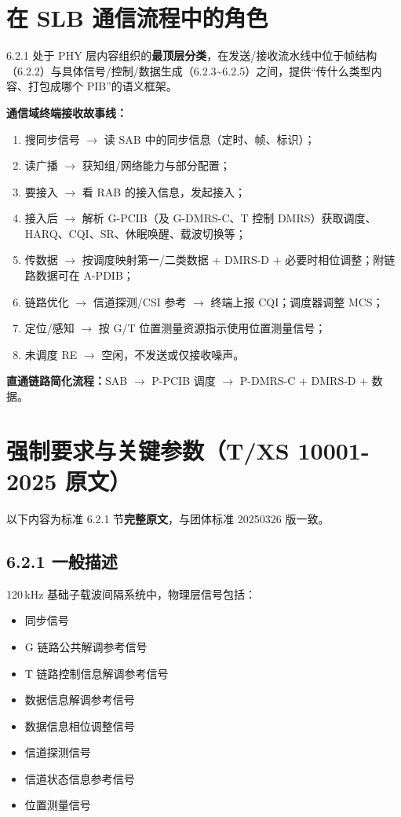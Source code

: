 \documentclass[11pt,a4paper]{ctexart}
\begin{document}
\section{在 SLB 通信流程中的角色}

6.2.1 处于 PHY 层内容组织的\textbf{最顶层分类}，在发送/接收流水线中位于帧结构（6.2.2）与具体信号/控制/数据生成（6.2.3\textasciitilde 6.2.5）之间，提供``传什么类型内容、打包成哪个 PIB''的语义框架。

\textbf{通信域终端接收故事线：}
\begin{enumerate}[nosep]
  \item 搜同步信号 $\rightarrow$ 读 SAB 中的同步信息（定时、帧、标识）；
  \item 读广播 $\rightarrow$ 获知组/网络能力与部分配置；
  \item 要接入 $\rightarrow$ 看 RAB 的接入信息，发起接入；
  \item 接入后 $\rightarrow$ 解析 G-PCIB（及 G-DMRS-C、T 控制 DMRS）获取调度、HARQ、CQI、SR、休眠唤醒、载波切换等；
  \item 传数据 $\rightarrow$ 按调度映射第一/二类数据 + DMRS-D + 必要时相位调整；附链路数据可在 A-PDIB；
  \item 链路优化 $\rightarrow$ 信道探测/CSI 参考 $\rightarrow$ 终端上报 CQI；调度器调整 MCS；
  \item 定位/感知 $\rightarrow$ 按 G/T 位置测量资源指示使用位置测量信号；
  \item 未调度 RE $\rightarrow$ 空闲，不发送或仅接收噪声。
\end{enumerate}

\textbf{直通链路简化流程：}SAB $\rightarrow$ P-PCIB 调度 $\rightarrow$ P-DMRS-C + DMRS-D + 数据。

\section{强制要求与关键参数（T/XS 10001-2025 原文）}

以下内容为标准 6.2.1 节\textbf{完整原文}，与团体标准 20250326 版一致。

\subsection{6.2.1 一般描述}

120\,kHz 基础子载波间隔系统中，物理层信号包括：
\begin{itemize}[nosep]
  \item 同步信号
  \item G 链路公共解调参考信号
  \item T 链路控制信息解调参考信号
  \item 数据信息解调参考信号
  \item 数据信息相位调整信号
  \item 信道探测信号
  \item 信道状态信息参考信号
  \item 位置测量信号
\end{itemize}
\end{document}

